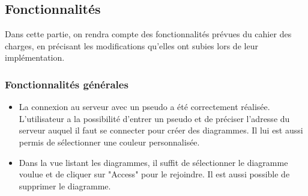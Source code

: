 \newpage
\subsection{Fonctionnalités}
Dans cette partie, on rendra compte des fonctionnalités prévues du cahier des charges, en précisant les modifications qu'elles ont subies lors de leur implémentation.

\subsubsection{Fonctionnalités générales}
	\begin{itemize}
		\item La connexion au serveur avec un pseudo a été correctement réalisée.
		L'utilisateur a la possibilité d'entrer un pseudo et de préciser l'adresse du serveur auquel il faut se connecter pour créer des diagrammes.
		Il lui est aussi permis de sélectionner une couleur personnalisée. 		
		\item Dans la vue listant les diagrammes, il suffit de sélectionner le diagramme voulue et de cliquer sur "Access" pour le rejoindre. Il est aussi possible de supprimer le diagramme.
		

\end{itemize}
